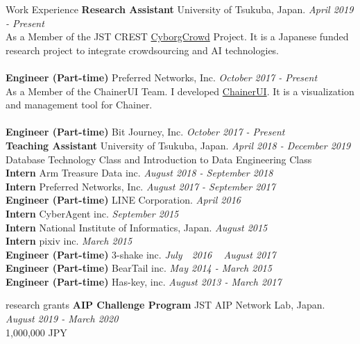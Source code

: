 \documentclass{resume} %
\begin{document}
\begin{rSection}{Work Experience}
{\bf Research Assistant} University of Tsukuba, Japan. \hfill {\em April 2019 - Present}
\\ As a Member of the JST CREST \href{https://www.dl.soc.i.kyoto-u.ac.jp/system/wp-content/uploads/2019/03/hcompWS18www.pdf}{CyborgCrowd} Project. It is a Japanese funded research project to integrate crowdsourcing and AI technologies.
\\\\
{\bf Engineer (Part-time) } Preferred Networks, Inc. \hfill {\em October 2017 - Present}
\\ As a Member of the ChainerUI Team. I developed \href{https://github.com/chainer/chainerui}{ChainerUI}. It is a visualization and management tool for Chainer.
\\\\
{\bf Engineer (Part-time) } Bit Journey, Inc. \hfill {\em October 2017 - Present} 
\\
{\bf Teaching Assistant } University of Tsukuba, Japan. \hfill {\em April 2018 - December 2019} 
\\ Database Technology Class and Introduction to Data Engineering Class
\\
{\bf Intern } Arm Treasure Data inc. \hfill {\em August 2018 - September 2018}
\\
{\bf Intern } Preferred Networks, Inc. \hfill {\em August 2017 - September 2017} 
\\
{\bf Engineer (Part-time) } LINE Corporation. \hfill {\em April 2016}
\\
{\bf Intern } CyberAgent inc. \hfill {\em September 2015}
\\
{\bf Intern } National Institute of Informatics, Japan. \hfill {\em August 2015}
\\
{\bf Intern } pixiv inc. \hfill {\em March 2015}
\\
{\bf Engineer (Part-time) } 3-shake inc. \hfill {\em July　2016 ~ August 2017}
\\
{\bf Engineer (Part-time) } BearTail inc. \hfill {\em May 2014 - March 2015}
\\
{\bf Engineer (Part-time) } Has-key, inc. \hfill {\em August 2013 - March 2017}
\end{rSection}


\begin{rSection}{research grants}
{\bf AIP Challenge Program } JST AIP Network Lab, Japan. \hfill {\em August 2019 - March 2020}
\\1,000,000 JPY

\end{rSection}
\end{document}
